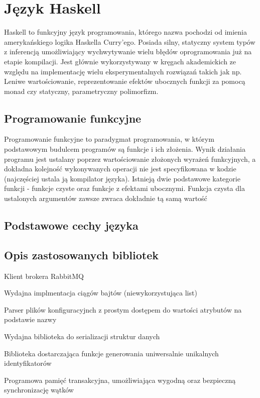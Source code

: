 \chapter{Język Haskell}
\label{cha:haskell}
Haskell to funkcyjny język programowania, którego nazwa pochodzi od imienia amerykańskiego logika Haskella Curry'ego. Posiada silny, statyczny system typów z inferencją umożliwiający wychwytywanie wielu błędów oprogramowania już na etapie kompilacji. Jest głównie wykorzystywany w kręgach akademickich ze względu na implementację wielu eksperymentalnych rozwiązań takich jak np. Leniwe wartościowanie, reprezentowanie efektów ubocznych funkcji za pomocą monad czy statyczny, parametryczny polimorfizm. 

\section{Programowanie funkcyjne}
\label{sec:funprog}
Programowanie funkcyjne to paradygmat programowania, w którym podstawowym budulcem programów są funkcje i ich złożenia. Wynik działania programu jest ustalany poprzez wartościowanie złożonych wyrażeń funkcyjnych, a dokładna kolejność wykonywanych operacji nie jest specyfikowana w kodzie (najczęściej ustala ją kompilator języka). Istnieją dwie podstawowe kategorie funkcji - funkcje czyste oraz funkcje z efektami ubocznymi. Funkcja czysta dla ustalonych argumentów zawsze zwraca dokładnie tą samą wartość 

\section{Podstawowe cechy języka}
\label{sec:cechyjezyka}

\section{Opis zastosowanych bibliotek}
\label{sec:cechyjezyka}
\begin{description}[align=left]
  \item [amqp] Klient brokera RabbitMQ
  \item [bytestring] Wydajna implmentacja ciągów bajtów (niewykorzystująca list)
  \item [configurator] Parser plików konfiguracyjnch z prostym dostępem do wartości atrybutów na podstawie nazwy
  \item [store] Wydajna biblioteka do serializacji struktur danych
  \item [uuid] Biblioteka dostarczająca funkcje generowania uniwersalnie unikalnych identyfikatorów
  \item [stm] Programowa pamięć transakcyjna, umożliwiająca wygodną oraz bezpieczną synchronizację wątków
\end{description}